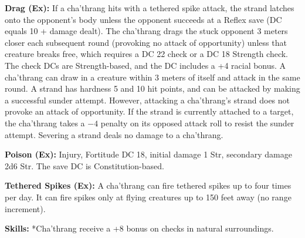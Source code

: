 \textbf{Drag (Ex):} If a cha'thrang hits with a tethered spike attack, the strand latches onto the opponent's body unless the opponent succeeds at a Reflex save (DC equals 10 + damage dealt). The cha'thrang drags the stuck opponent 3 meters closer each subsequent round (provoking no attack of opportunity) unless that creature breaks free, which requires a DC 22  check or a DC 18 Strength check. The check DCs are Strength-based, and the  DC includes a +4 racial bonus. A cha'thrang can draw in a creature within 3 meters of itself and attack in the same round. A strand has hardness 5 and 10 hit points, and can be attacked by making a successful sunder attempt. However, attacking a cha'thrang's strand does not provoke an attack of opportunity. If the strand is currently attached to a target, the cha'thrang takes a $-4$ penalty on its opposed attack roll to resist the sunder attempt. Severing a strand deals no damage to a cha'thrang.

\textbf{Poison (Ex):} Injury, Fortitude DC 18, initial damage 1 Str, secondary damage 2d6 Str. The save DC is Constitution-based.

\textbf{Tethered Spikes (Ex):} A cha'thrang can fire tethered spikes up to four times per day. It can fire spikes only at flying creatures up to 150 feet away (no range increment).

\textbf{Skills:} *Cha'thrang receive a +8 bonus on  checks in natural surroundings.
